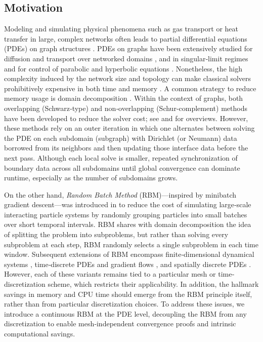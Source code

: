 \documentclass[a4paper, 10pt, english]{article}
\begin{document}
\subsection{Motivation}
Modeling and simulating physical phenomena such as gas transport or heat transfer in large, complex networks often leads to partial differential equations (PDEs) on graph structures \cite{MR3728372,Leuge,Mugnolo,wad1}. PDEs on graphs have been extensively studied for diffusion and transport over networked domains \cite{Leuge,Mugnolo,wad1,wad3,MR2818413}, and in singular‐limit regimes \cite{Egger,barcena2025control} and for control of parabolic and hyperbolic equations \cite{MR4421539,MR4581791,dager2006wave}. Nonetheless, the high complexity induced by the network size and topology can make classical solvers prohibitively expensive in both time and memory \cite{MR4175147}. A common strategy to reduce memory usage is domain decomposition \cite{MR2093789}. Within the context of graphs, both overlapping (Schwarz‐type) and non‐overlapping (Schur‐complement) methods have been developed to reduce the solver cost; see \cite[Chapter III]{MR2093789} and \cite{MR1857663} for overviews.  However, these methods rely on an outer iteration in which one alternates between solving the PDE on each subdomain (subgraph) with Dirichlet (or Neumann) data borrowed from its neighbors and then updating those interface data before the next pass. Although each local solve is smaller, repeated synchronization of boundary data across all subdomains until global convergence can dominate runtime, especially as the number of subdomains grows.


On the other hand, \emph{Random Batch Method} (RBM)—inspired by minibatch gradient descent—was introduced in \cite{ShietalRBM,MR4230431} to reduce the cost of simulating large‐scale interacting particle systems by randomly grouping particles into small batches over short temporal intervals. RBM shares with domain decomposition the idea of splitting the problem into subproblems, but rather than solving every subproblem at each step, RBM randomly selects a single subproblem in each time window. Subsequent extensions of RBM encompass finite‐dimensional dynamical systems \cite{MR4433122,MR4307003,veldman2023stability}, time‐discrete PDEs and gradient flows \cite{eisenmann2022randomized,Corella_hernandez2025}, and spatially discrete PDEs \cite{firstpaper}. However, each of these variants remains tied to a particular mesh or time‐discretization scheme, which restricts their applicability. In addition, the hallmark savings in memory and CPU time should emerge from the RBM principle itself, rather than from particular discretization choices. To address these issues, we introduce a continuous RBM at the PDE level, decoupling the RBM from any discretization to enable mesh‐independent convergence proofs and intrinsic computational savings.
\end{document}
